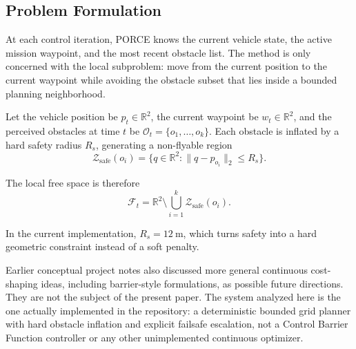 \documentclass[journal,twoside,web]{ieeecolor}
\begin{document}

\subsection{Problem Formulation}

At each control iteration, PORCE knows the current vehicle state, the active mission waypoint, and the most recent obstacle list. The method is only concerned with the local subproblem: move from the current position to the current waypoint while avoiding the obstacle subset that lies inside a bounded planning neighborhood.

Let the vehicle position be \(p_t \in \mathbb{R}^2\), the current waypoint be \(w_t \in \mathbb{R}^2\), and the perceived obstacles at time \(t\) be \(\mathcal{O}_t = \{o_1,\dots,o_k\}\). Each obstacle is inflated by a hard safety radius \(R_s\), generating a non-flyable region
\begin{equation}
    \mathcal{Z}_{\mathrm{safe}}(o_i) = \{q \in \mathbb{R}^2 : \lVert q - p_{o_i} \rVert_2 \le R_s\}.
\end{equation}

The local free space is therefore
\begin{equation}
    \mathcal{F}_t = \mathbb{R}^2 \setminus \bigcup_{i=1}^{k} \mathcal{Z}_{\mathrm{safe}}(o_i).
\end{equation}

In the current implementation, \(R_s = \SI{12}{\meter}\), which turns safety into a hard geometric constraint instead of a soft penalty.

Earlier conceptual project notes also discussed more general continuous cost-shaping ideas, including barrier-style formulations, as possible future directions. They are not the subject of the present paper. The system analyzed here is the one actually implemented in the repository: a deterministic bounded grid planner with hard obstacle inflation and explicit failsafe escalation, not a Control Barrier Function controller or any other unimplemented continuous optimizer.
\end{document}
